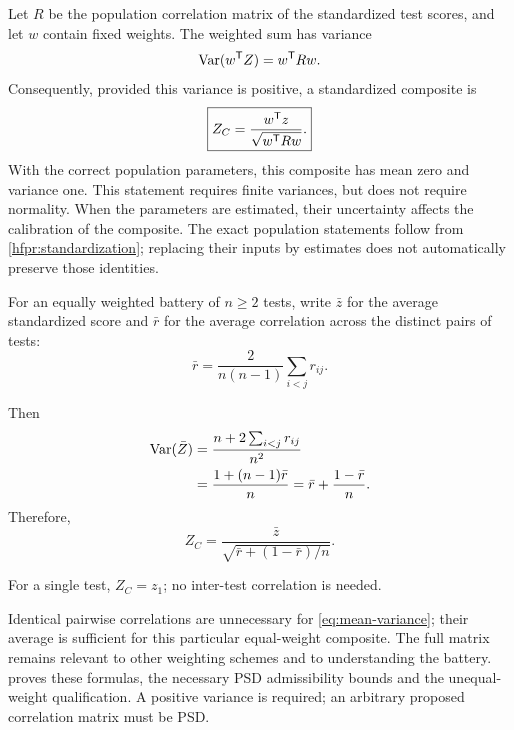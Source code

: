 Let \(R\) be the population correlation matrix of the standardized test
scores, and let \(w\) contain fixed weights. The weighted sum has variance
\begin{equation}
  \operatorname{Var}(w^{\mathsf{T}} Z)=w^{\mathsf{T}} Rw.
  \label{eq:weighted-variance}
\end{equation}
Consequently, provided this variance is positive, a standardized composite is
\begin{equation}
  \boxed{Z_C=\frac{w^{\mathsf{T}} z}{\sqrt{w^{\mathsf{T}} Rw}}.}
  \label{eq:weighted-composite}
\end{equation}
With the correct population parameters, this composite has mean zero and
variance one. This statement requires finite variances, but does not require
normality. When the parameters are estimated, their uncertainty affects the
calibration of the composite.
The exact population statements follow from
\cref{hfpr:standardization}; replacing their inputs by estimates does
not automatically preserve those identities.

For an equally weighted battery of \(n\geq2\) tests, write \(\bar z\) for the
average standardized score and \(\bar r\) for the average correlation across
the distinct pairs of tests:
\begin{equation}
  \bar r=\frac{2}{n(n-1)}\sum_{i<j}r_{ij}.
  \label{eq:average-correlation}
\end{equation}
\begin{samepage}
Then
\begin{equation}
  \begin{aligned}
    \operatorname{Var}(\bar Z)
    &=\frac{n+2\sum_{i<j}r_{ij}}{n^2}\\
    &=\frac{1+(n-1)\bar r}{n}
     =\bar r+\frac{1-\bar r}{n}.
  \end{aligned}
  \label{eq:mean-variance}
\end{equation}
Therefore,
\begin{equation}
  \boxed{Z_C=\frac{\bar z}{\sqrt{\bar r+(1-\bar r)/n}}.}
  \label{eq:equal-composite}
\end{equation}
\end{samepage}
For a single test, \(Z_C=z_1\); no inter-test correlation is needed.

Identical pairwise correlations are unnecessary for
\cref{eq:mean-variance}; their average is sufficient for this particular
equal-weight composite. The full matrix remains relevant to other weighting
schemes and to understanding the battery.
 proves these formulas, the necessary PSD
admissibility bounds and the unequal-weight qualification. A positive
variance is required; an arbitrary proposed correlation matrix must be PSD.

